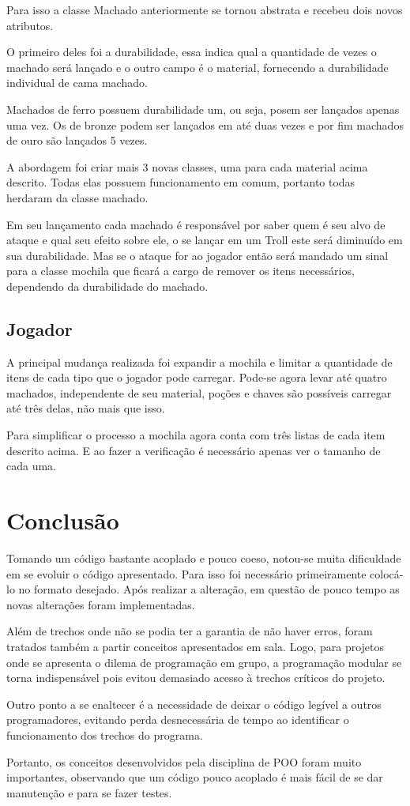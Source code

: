 \documentclass[runningheads,a4paper]{llncs}
\begin{document}
		Para isso a classe Machado anteriormente se tornou abstrata e recebeu dois novos atributos. 
		
		O primeiro deles foi a durabilidade, essa indica qual a quantidade de vezes o machado será lançado e o outro campo é o material, fornecendo a durabilidade individual de cama machado.
		
		Machados de ferro possuem durabilidade um, ou seja, posem ser lançados apenas uma vez. Os de bronze podem ser lançados em até duas vezes e por fim machados de ouro são lançados 5 vezes.
		
		A abordagem foi criar mais 3 novas classes, uma para cada material acima descrito. Todas elas possuem funcionamento em comum, portanto todas herdaram da classe machado.
		
		Em seu lançamento cada machado é responsável por saber quem é seu alvo de ataque e qual seu efeito sobre ele, o se lançar em um Troll este será diminuído em sua durabilidade. Mas se o ataque for ao jogador então será mandado um sinal para a classe mochila que ficará a cargo de remover os itens necessários, dependendo da durabilidade do machado.
		
	\subsection{Jogador}
		A principal mudança realizada foi expandir a mochila e limitar a quantidade de itens de cada tipo que o jogador pode carregar. Pode-se agora levar até quatro machados, independente de seu material, poções e chaves são possíveis carregar até três delas, não mais que isso. 
		
		Para simplificar o processo a mochila agora conta com três listas de cada item descrito acima. E ao fazer a verificação é necessário apenas ver o tamanho de cada uma. 

\section{Conclusão}
	Tomando um código bastante acoplado e pouco coeso, notou-se muita dificuldade em se evoluir o código apresentado. Para isso foi necessário primeiramente colocá-lo no formato desejado. Após realizar a alteração, em questão de pouco tempo as novas alterações foram implementadas.
	
	Além de trechos onde não se podia ter a garantia de não haver erros, foram tratados também a partir conceitos apresentados em sala.	Logo, para projetos onde se apresenta o dilema de programação em grupo, a programação modular se torna indispensável pois evitou demasiado acesso à trechos críticos do projeto. 
	
	Outro ponto a se enaltecer é a necessidade de deixar o código legível a outros programadores, evitando perda desnecessária de tempo ao identificar o funcionamento dos trechos do programa.

	Portanto, os conceitos desenvolvidos pela disciplina de POO foram muito importantes, observando que um código pouco acoplado é mais fácil de se dar manutenção e para se fazer testes.


\nocite{*} 
\end{document}
